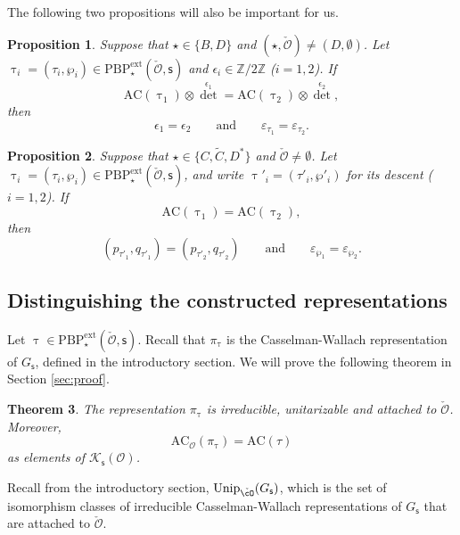 \documentclass[12pt,a4paper]{amsart}
\newcommand{\CK}{{\mathcal {K}}}
\newcommand{\CO}{{\mathcal {O}}}
\newcommand{\Z}{\mathbb{Z}}
\numberwithin{equation}{section}
\newtheorem{thm}{Theorem}[section]
\newtheorem{prop}[thm]{Proposition}
\theoremstyle{remark}
\def\Unip{\mathrm{Unip}}
\def\PBPe{\mathrm{PBP}^{\mathrm{ext}}}
\begin{document}
The following two propositions will also be important for us.
\begin{prop}\label{thmac4}
Suppose that  $\star\in \{B,D\}$ and $(\star, \check \CO)\neq (D, \emptyset)$. Let $\uptau_i=(\tau_i, \wp_i)\in \PBPe_\star(\check \CO,\mathsf s)$ and $\epsilon_i\in \Z/2\Z$ ($i=1,2$).   If
\[
  \mathrm{AC}(\uptau_1)\otimes {\det}^{\epsilon_1}= \mathrm{AC}(\uptau_2)\otimes {\det}^{\epsilon_2},
\]
then
\[
  \epsilon_1=\epsilon_2\qquad\textrm{and}\qquad \varepsilon_{\tau_1}=\varepsilon_{\tau_2}.
\]
 \end{prop}


\begin{prop}\label{thmac5}
Suppose that  $\star\in \{C,\widetilde C, D^*\}$ and $\check \CO\neq \emptyset$. Let $\uptau_i=(\tau_i, \wp_i)\in \PBPe_\star(\check \CO,\mathsf s)$, and write $\uptau'_i=(\tau'_i, \wp'_i)$ for its descent ($i=1,2$).   If
\[
  \mathrm{AC}(\uptau_1)= \mathrm{AC}(\uptau_2),
\]
then
\[
 ( p_{\tau'_1}, q_{\tau'_1})=( p_{\tau'_2}, q_{\tau'_2})\qquad\textrm{and}\qquad \varepsilon_{\wp_1}=\varepsilon_{\wp_2}.
\]
 \end{prop}

\subsection{Distinguishing the constructed representations}


Let $\uptau\in \PBPe_\star(\check \CO,\mathsf s)$. Recall that $\pi_\uptau$ is the Casselman-Wallach representation of $G_{\mathsf s}$, defined in the introductory section.
We will prove the following theorem in Section \ref{sec:proof}.

\begin{thm}\label{thmpitau}
The representation $\pi_\uptau$ is irreducible, unitarizable and attached to $\check \CO$. Moreover,
\[
\mathrm{AC}_\CO(\pi_\uptau)=\mathrm{AC}(\tau)
\]
 as elements of $\CK_{\mathsf s}(\CO)$.
\end{thm}

Recall from the introductory section, $\Unip_{\check \cO}(G_\mathsf s)$, which is the set of isomorphism classes of irreducible Casselman-Wallach representations of $G_\mathsf s$ that are attached to $\check \CO$.
\end{document}
